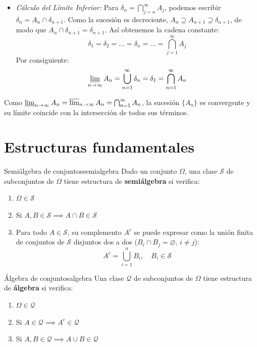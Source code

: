 \begin{demostracion}
\begin{enumerate}[label=\alph*)]
\begin{itemize}
        \item \textit{Cálculo del Límite Inferior:}
        Para $\delta_n = \bigcap_{j=n}^\infty A_j$, podemos escribir $\delta_n = A_n \cap \delta_{n+1}$. Como la sucesión es decreciente, $A_n \supseteq A_{n+1} \supseteq \delta_{n+1}$, de modo que $A_n \cap \delta_{n+1} = \delta_{n+1}$. 
        Así obtenemos la cadena constante:
        \[
            \delta_1 = \delta_2 = \dots = \delta_n = \dots = \bigcap_{j=1}^\infty A_j
        \]
        Por consiguiente:
        \[
            \varliminf_{n \to \infty} A_n = \bigcup_{n=1}^\infty \delta_n = \delta_1 = \bigcap_{n=1}^\infty A_n
        \]
    \end{itemize}
    Como $\varliminf_{n \to \infty} A_n = \varlimsup_{n \to \infty} A_n = \bigcap_{n=1}^\infty A_n$, la sucesión $\{A_n\}$ es convergente y su límite coincide con la intersección de todos sus términos.
\end{enumerate}
\end{demostracion}

\newpage

\section{Estructuras fundamentales}

\begin{definicion}{Semiálgebra de conjuntos}{semialgebra}
Dado un conjunto $\Omega$, una clase $\mathcal{S}$ de subconjuntos de $\Omega$ tiene estructura de \textbf{semiálgebra} si verifica:
\begin{enumerate}
    \item $\Omega \in \mathcal{S}$
    \item Si $A, B \in \mathcal{S} \implies A \cap B \in \mathcal{S}$
    \item Para todo $A \in \mathcal{S}$, su complemento $A^c$ se puede expresar como la unión finita de conjuntos de $\mathcal{S}$ disjuntos dos a dos ($B_i \cap B_j = \varnothing, \, i \neq j$):
    \[
        A^c = \bigcup_{i=1}^n B_i, \quad B_i \in \mathcal{S}
    \]
\end{enumerate}
\end{definicion}

\begin{definicion}{Álgebra de conjuntos}{algebra}
Una clase $\mathcal{Q}$ de subconjuntos de $\Omega$ tiene estructura de \textbf{álgebra} si verifica:
\begin{enumerate}
    \item $\Omega \in \mathcal{Q}$
    \item Si $A \in \mathcal{Q} \implies A^c \in \mathcal{Q}$
    \item Si $A, B \in \mathcal{Q} \implies A \cup B \in \mathcal{Q}$
\end{enumerate}
\end{definicion}

